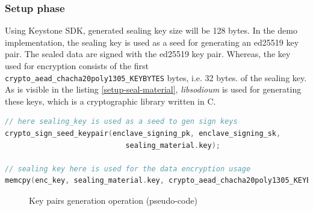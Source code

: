\subsubsection{Setup phase}
Using Keystone SDK, generated sealing key size will be 128 bytes. In the demo implementation, the sealing key is used as a seed for generating an ed25519 key pair. The sealed data are signed with the ed25519 key pair. Whereas, the key used for encryption consists of the first \texttt{crypto\_aead\_chacha20poly1305\_KEYBYTES} bytes, i.e. 32 bytes. of the sealing key. As is visible in the listing \ref{setup-seal-material}, \textit{libsodioum} \cite{libsodium} is used for generating these keys, which is a cryptographic library written in C. \\

\begin{lstlisting}[caption={Setup of the encryption key and ed25519 keypair},captionpos=b,label={setup-seal-material},language=C,frame=single]
// here sealing_key is used as a seed to gen sign keys
crypto_sign_seed_keypair(enclave_signing_pk, enclave_signing_sk,
                            sealing_material.key);

// sealing key here is used for the data encryption usage
memcpy(enc_key, sealing_material.key, crypto_aead_chacha20poly1305_KEYBYTES); 
\end{lstlisting}

\begin{figure}[!h]
    \centering
    
    \caption{Key pairs generation operation (pseudo-code)}
    \label{poc-gen-keys}
\end{figure}

